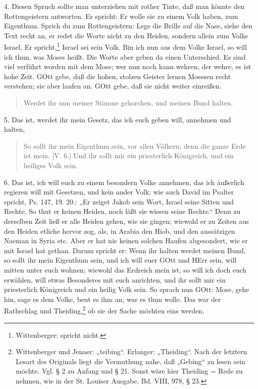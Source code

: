 4. Diesen Spruch sollte man unterziehen mit rother Tinte, daß man könnte den Rottengeistern antworten. Er spricht: Er wolle sie zu einem Volk haben, zum Eigenthum. Sprich du zum Rottengeistern: Lege die Brille auf die Nase, siehe den Text recht an, er redet die Worte nicht zu den Heiden, sondern allein zum Volke Israel. Er spricht,\footnote{Wittenberger: spricht nicht.} Israel sei sein Volk. Bin ich nun aus dem Volke Israel, so will ich thun, was Moses heißt. Die Worte aber geben da einen Unterschied. Es sind viel verführt worden mit dem Mose; wer nun noch kann wehren, der wehre, es ist hohe Zeit. GOtt gebe, daß die hohen, stolzen Geister lernen Mosesen recht verstehen; sie aber laufen an. GOtt gebe, daß sie nicht weiter einreißen.

\begin{quote}
Werdet ihr nun meiner Stimme gehorchen, und meinen Bund halten.
\end{quote}

5. Das ist, werdet ihr mein Gesetz, das ich euch geben will, annehmen und halten,

\begin{quote}
So sollt ihr mein Eigenthum sein, vor allen Völkern; denn die ganze Erde ist mein. [V. 6.] Und ihr sollt mir ein priesterlich Königreich, und ein heiliges Volk sein.
\end{quote}

6. Das ist, ich will euch zu einem besondern Volke annehmen, das ich äußerlich regieren will mit Gesetzen, und kein ander Volk; wie auch David im Psalter spricht, Ps. 147, 19. 20.: „Er zeiget Jakob sein Wort, Israel seine Sitten und Rechte. So thut er keinen Heiden, noch läßt sie wissen seine Rechte.“ Denn zu derselben Zeit ließ er alle Heiden gehen, wie sie gingen; wiewohl er zu Zeiten aus den Heiden etliche hervor zog, als, in Arabia den Hiob, und den aussätzigen Naeman in Syria etc. Aber er hat nie keinen solchen Haufen abgesondert, wie er mit Israel hat gethan. Darum spricht er: Wenn ihr halten werdet meinen Bund, so sollt ihr mein Eigenthum sein, und ich will euer GOtt und HErr sein, will mitten unter euch wohnen; wiewohl das Erdreich mein ist, so will ich doch euch erwählen, will etwas Besonderes mit euch anrichten, und ihr sollt mir ein priesterlich Königreich und ein heilig Volk sein. So sprach nun GOtt: Mose, gehe hin, sage es dem Volke, beut es ihm an, was es thun wolle. Das war der Rathschlag und Theiding,\footnote{Wittenberger und Jenaer: „teibing“. Erlanger: „Theiding“. Nach der letztern Lesart des Originals liegt die Vermuthung nahe, daß „Gebing“ zu lesen sein möchte. Vgl. § 2 zu Anfang und § 21. Sonst wäre hier Theiding = Rede zu nehmen, wie in der St. Louiser Ausgabe, Bd. VIII, 978, § 23.} ob sie der Sache möchten eins werden.

